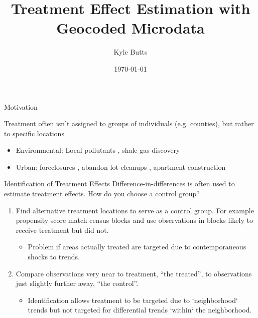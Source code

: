 \documentclass[aspectratio=43]{beamer}
\title{Treatment Effect Estimation with Geocoded Microdata}
\subtitle{}
\date{\today}
\author{Kyle Butts}
\begin{document}
\maketitle

\begin{frame}{Motivation}

    Treatment often isn't assigned to groups of individuals (e.g. counties), but rather to specific locations

    \begin{itemize} 
        \item Environmental: Local pollutants , shale gas discovery 
    
        \item Urban: foreclosures , abandon lot cleanups , apartment construction  
    \end{itemize}
\end{frame}


\begin{frame}{Identification of Treatment Effects}
    Difference-in-differences is often used to estimate treatment effects. How do you choose a control group?
    \vspace{2.5mm}
    
    \begin{enumerate}
        \item<1> Find alternative treatment locations to serve as a control group. For example propensity score match census blocks and use observations in blocks likely to receive treatment but did not.
            
            \begin{itemize}
                \item Problem if areas actually treated are targeted due to contemporaneous shocks to trends.
            \end{itemize}
        
        \item<2> Compare observations very near to treatment, ``the treated'', to observations just slightly further away, ``the control''.
            
            \begin{itemize}
                \item Identification allows treatment to be targeted due to `neighborhood` trends but not targeted for differential trends `within` the neighborhood.
            \end{itemize} 
    \end{enumerate}
\end{frame}
\end{document}
